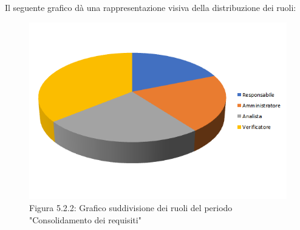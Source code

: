 Il seguente grafico dà una rappresentazione visiva della distribuzione dei ruoli: \\
\begin{figure} [H]
	\centering
	\includegraphics[scale=1]{Res/ExcelGrafici/Grafici/ConsolidamentoRuoli.png}
	\caption{Figura 5.2.2: Grafico suddivisione dei ruoli del periodo "Consolidamento dei requisiti"}\label{}
\end{figure}

\pagebreak
